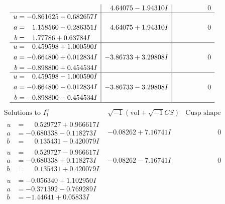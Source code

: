 \documentclass[1p]{elsarticle_modified}
\theoremstyle{definition}
\newcommand{\I}{\sqrt{-1}}
\begin{document}
$$\begin{array}{c|c|c}
 & \phantom{-}4.64075 - 1.94310 I & \phantom{-0.000000 } 0 \\ \hline\begin{aligned}
u &= -0.861625 - 0.682657 I \\
a &= \phantom{-}1.158560 - 0.286351 I \\
b &= \phantom{-}1.77786 + 0.63784 I\end{aligned}
 & \phantom{-}4.64075 + 1.94310 I & \phantom{-0.000000 } 0 \\ \hline\begin{aligned}
u &= \phantom{-}0.459598 + 1.000590 I \\
a &= -0.664800 + 0.012834 I \\
b &= -0.898800 + 0.454534 I\end{aligned}
 & -3.86733 + 3.29808 I & \phantom{-0.000000 } 0 \\ \hline\begin{aligned}
u &= \phantom{-}0.459598 - 1.000590 I \\
a &= -0.664800 - 0.012834 I \\
b &= -0.898800 - 0.454534 I\end{aligned}
 & -3.86733 - 3.29808 I & \phantom{-0.000000 } 0\\
 \hline 
 \end{array}$$\newpage$$\begin{array}{c|c|c}  
\text{Solutions to }I^u_{1}& \I (\text{vol} + \sqrt{-1}CS) & \text{Cusp shape}\\
 \hline 
\begin{aligned}
u &= \phantom{-}0.529727 + 0.966617 I \\
a &= -0.680338 - 0.118273 I \\
b &= \phantom{-}0.135431 - 0.420079 I\end{aligned}
 & -0.08262 + 7.16741 I & \phantom{-0.000000 } 0 \\ \hline\begin{aligned}
u &= \phantom{-}0.529727 - 0.966617 I \\
a &= -0.680338 + 0.118273 I \\
b &= \phantom{-}0.135431 + 0.420079 I\end{aligned}
 & -0.08262 - 7.16741 I & \phantom{-0.000000 } 0 \\ \hline\begin{aligned}
u &= -0.056340 + 1.102950 I \\
a &= -0.371392 - 0.769289 I \\
b &= -1.44641 + 0.05833 I\end{aligned}

\end{array}$$
\end{document}
